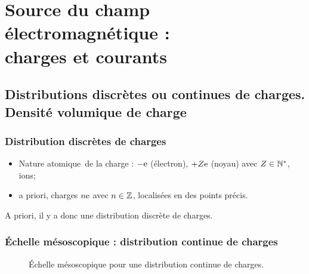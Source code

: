 \section[Charges et courants]{Source du champ électromagnétique :\\charges et courants}

    \subsection[Distributions discrètes ou continues de charges]{Distributions discrètes ou continues de charges. Densité volumique de charge}

        \subsubsection{Distribution discrètes de charges}

            \begin{itemize}[label=$\longrightarrow$]
                \item Nature \og atomique\fg~de la charge : $-\mathrm{e}$ (électron), $+Z\mathrm{e}$ (noyau) avec $Z\in\mathbb{N}^{*}$, ions;
                \item a priori, charges $n\mathrm{e}$ avec $n\in\mathbb{Z}$, localisées en des points précis. 
            \end{itemize}

            A priori, il y a donc une distribution discrète de charges.

        \subsubsection{Échelle mésoscopique : distribution continue de charges}

            \begin{figure}
                \centering
                \caption[Échelle mésoscopique pour une distribution de charges.]{Échelle mésoscopique pour une distribution continue de charges.}    
                \label{fig:echelle_meso_distribution_continue_charge}
            \end{figure}

